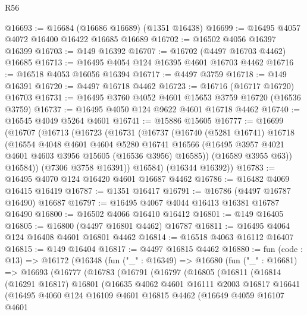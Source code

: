 \begin{lexlean}{R56}
\begin{coremodule}
@16693 := @16684 (@16686 @16689) (@1351 @16438)
@16699 := @16495 @4057 @4072 @16400 @16422 @16685 @16689
@16702 := @16502 @4056 @16397 @16399
@16703 := @149 @16392
@16707 := @16702 (@4497 @16703 @4462) @16685
@16713 := @16495 @4054 @124 @16395 @4601 @16703 @4462
@16716 := @16518 @4053 @16056 @16394
@16717 := @4497 @3759
@16718 := @149 @16391
@16720 := @4497 @16718 @4462
@16723 := @16716 (@16717 @16720) @16703
@16731 := @16495 @3760 @4052 @4601 @15653 @3759 @16720 (@16536 @3759)
@16737 := @16495 @4050 @124 @9622 @4601 @16718 @4462
@16740 := @16545 @4049 @5264 @4601
@16741 := @15886 @15605
@16777 := @16699
    (@16707
      (@16713
        (@16723
          (@16731
            (@16737
              (@16740
                (@5281 @16741)
                @16718
                (@16554
                  @4048
                  @4601
                  @4604
                  @5280
                  @16741
                  @16566
                  (@16495 @3957 @4021 @4601 @4603 @3956 @15605 (@16536 @3956) @16585))
                (@16589 @3955 @63))
              @16584))
          (@7306 @3758 @16391))
        @16584)
      (@16344 @16392))
@16783 := @16495 @4070 @124 @16420 @4601 @16687 @4462
@16786 := @16482 @4069 @16415 @16419
@16787 := @1351 @16417
@16791 := @16786 (@4497 @16787 @16490) @16687
@16797 := @16495 @4067 @4044 @16413 @16381 @16787 @16490
@16800 := @16502 @4066 @16410 @16412
@16801 := @149 @16405
@16805 := @16800 (@4497 @16801 @4462) @16787
@16811 := @16495 @4064 @124 @16408 @4601 @16801 @4462
@16814 := @16518 @4063 @16112 @16407
@16815 := @149 @16404
@16817 := @4497 @16815 @4462
@16880 := fun (code : @13) =>
  @16172
    (@16348
      (fun ("_" : @16349) =>
      @16680
        (fun ("_" : @16681) =>
        @16693
          (@16777
            (@16783
              (@16791
                (@16797
                  (@16805
                    (@16811
                      (@16814
                        (@16291 @16817)
                        @16801
                        (@16635
                          @4062
                          @4601
                          @16111
                          @2003
                          @16817
                          @16641
                          (@16495
                            @4060
                            @124
                            @16109
                            @4601
                            @16815
                            @4462
                            (@16649
                              @4059
                              @16107
                              @4601

\end{coremodule}
\end{lexlean}
